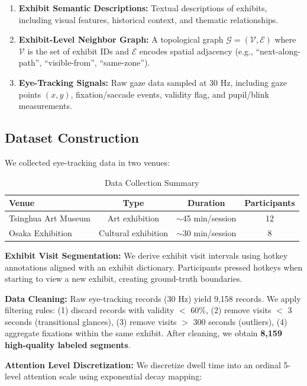 \documentclass[letterpaper]{article}
\begin{document}
\begin{enumerate}
    \item \textbf{Exhibit Semantic Descriptions:} Textual descriptions of exhibits, including visual features, historical context, and thematic relationships.
    \item \textbf{Exhibit-Level Neighbor Graph:} A topological graph $\mathcal{G} = (\mathcal{V}, \mathcal{E})$ where $\mathcal{V}$ is the set of exhibit IDs and $\mathcal{E}$ encodes spatial adjacency (e.g., ``next-along-path'', ``visible-from'', ``same-zone'').
    \item \textbf{Eye-Tracking Signals:} Raw gaze data sampled at 30 Hz, including gaze points $(x, y)$, fixation/saccade events, validity flag, and pupil/blink measurements.
\end{enumerate}

\subsection{Dataset Construction}

We collected eye-tracking data in two venues:

\begin{table}[h]
\centering
\caption{Data Collection Summary}
\begin{tabular}{lccc}
\toprule
Venue & Type & Duration & Participants \\
\midrule
Tsinghua Art Museum & Art exhibition & $\sim$45 min/session & 12 \\
Osaka Exhibition & Cultural exhibition & $\sim$30 min/session & 8 \\
\bottomrule
\end{tabular}
\end{table}

\textbf{Exhibit Visit Segmentation:} We derive exhibit visit intervals using hotkey annotations aligned with an exhibit dictionary. Participants pressed hotkeys when starting to view a new exhibit, creating ground-truth boundaries.

\textbf{Data Cleaning:} Raw eye-tracking records (30 Hz) yield 9,158 records. We apply filtering rules: (1) discard records with validity $<$ 60\%, (2) remove visits $<$ 3 seconds (transitional glances), (3) remove visits $>$ 300 seconds (outliers), (4) aggregate fixations within the same exhibit. After cleaning, we obtain \textbf{8,159 high-quality labeled segments}.

\textbf{Attention Level Discretization:} We discretize dwell time into an ordinal 5-level attention scale using exponential decay mapping:
\end{document}
